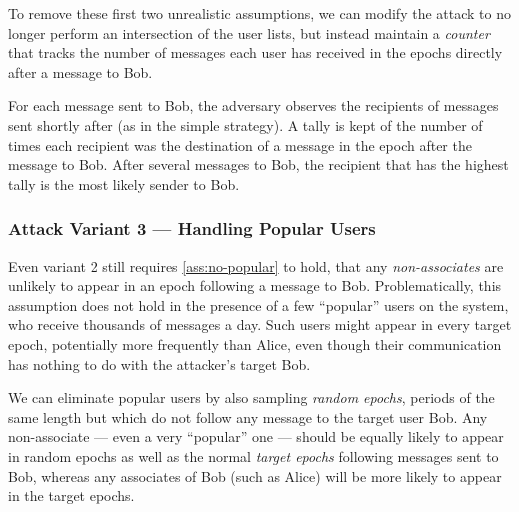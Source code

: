 To remove these first two unrealistic assumptions, we can modify the
attack to no longer perform an intersection of
the user lists, but instead maintain a \emph{counter} that tracks the number of
messages each user has received in the epochs directly after a message to Bob.

For each message sent to Bob, the adversary observes the recipients of messages
sent shortly after (as in the simple strategy). A tally is kept of the number of times each
recipient was the destination of a message in the epoch after the message to Bob.
After several messages to Bob, the recipient that has the highest tally is the
most likely sender to Bob.




\subsubsection{Attack Variant 3 --- Handling Popular Users}
\label{sec:signal-attack3}

Even variant 2 still requires \cref{ass:no-popular} to hold, that
any \emph{non-associates} are unlikely to appear in an epoch following a message to Bob.  Problematically, this assumption does not hold in the presence of a few
``popular'' users on the system, who receive thousands of messages a
day. Such users might appear in every target epoch, potentially more frequently than Alice, even
though their communication has nothing to do with the attacker's target Bob.

We can eliminate popular users by also sampling \emph{random epochs},
periods of the same length but which do not follow any message to the
target user Bob. Any non-associate --- even a very ``popular'' one ---
should be equally likely to appear in random epochs as well as the
normal \emph{target epochs} following messages sent to Bob, whereas any
associates of Bob (such as Alice) will be more likely to appear in the
target epochs.

